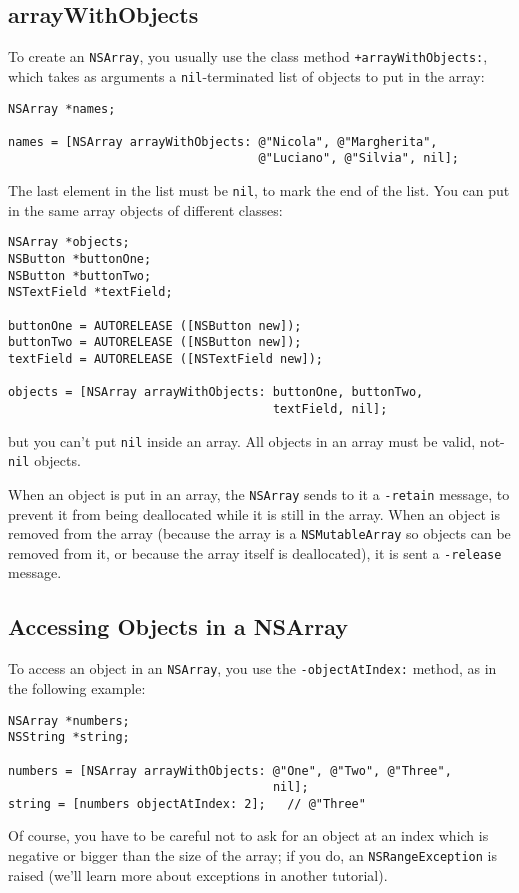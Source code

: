\documentclass[a4paper]{article}
\begin{document}
\subsection{arrayWithObjects}
To create an \texttt{NSArray}, you usually use the class method
\texttt{+arrayWithObjects:}, which takes as arguments 
a \texttt{nil}-terminated list of objects to put in the array:
\begin{verbatim}
NSArray *names;

names = [NSArray arrayWithObjects: @"Nicola", @"Margherita",
                                   @"Luciano", @"Silvia", nil];
\end{verbatim}
The last element in the list must be \texttt{nil}, to mark the end of
the list.  You can put in the same array objects of different classes:
\begin{verbatim}
NSArray *objects;
NSButton *buttonOne;
NSButton *buttonTwo;
NSTextField *textField;

buttonOne = AUTORELEASE ([NSButton new]);
buttonTwo = AUTORELEASE ([NSButton new]);
textField = AUTORELEASE ([NSTextField new]);

objects = [NSArray arrayWithObjects: buttonOne, buttonTwo, 
                                     textField, nil];
\end{verbatim}
but you can't put \texttt{nil} inside an array.  All objects 
in an array must be valid, not-\texttt{nil} objects.

When an object is put in an array, the \texttt{NSArray} sends to it a
\texttt{-retain} message, to prevent it from being deallocated while
it is still in the array.  When an object is removed from the array
(because the array is a \texttt{NSMutableArray} so objects can be
removed from it, or because the array itself is deallocated), it
is sent a \texttt{-release} message.

\subsection{Accessing Objects in a NSArray}
To access an object in an \texttt{NSArray}, you use the 
\texttt{-objectAtIndex:} method, as in the following example: 
\begin{verbatim}
NSArray *numbers;
NSString *string;

numbers = [NSArray arrayWithObjects: @"One", @"Two", @"Three", 
                                     nil];
string = [numbers objectAtIndex: 2];   // @"Three"
\end{verbatim}
Of course, you have to be careful not to ask for an object at an index
which is negative or bigger than the size of the array; if you do, an
\texttt{NSRangeException} is raised (we'll learn more about exceptions
in another tutorial).
\end{document}
